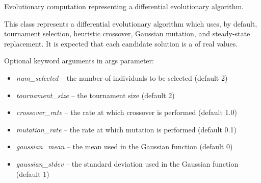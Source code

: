 \documentclass[letterpaper,10pt,english]{sphinxmanual}
\begin{document}
\begin{fulllineitems}
\label{reference:inspyred.ec.DEA}
Evolutionary computation representing a differential evolutionary algorithm.

This class represents a differential evolutionary algorithm which uses, by 
default, tournament selection, heuristic crossover, Gaussian mutation,
and steady-state replacement. It is expected that each candidate solution 
is a  of real values.

Optional keyword arguments in  args parameter:
\begin{itemize}
\item {} 
\emph{num\_selected} -- the number of individuals to be selected (default 2)

\item {} 
\emph{tournament\_size} -- the tournament size (default 2)

\item {} 
\emph{crossover\_rate} -- the rate at which crossover is performed 
(default 1.0)

\item {} 
\emph{mutation\_rate} -- the rate at which mutation is performed (default 0.1)

\item {} 
\emph{gaussian\_mean} -- the mean used in the Gaussian function (default 0)

\item {} 
\emph{gaussian\_stdev} -- the standard deviation used in the Gaussian function
(default 1)

\end{itemize}

\end{fulllineitems}

\end{document}
